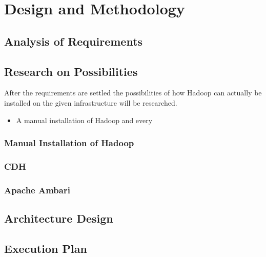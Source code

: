 \chapter{Design and Methodology}
\label{chap:design}

\section{Analysis of Requirements}

\section{Research on Possibilities}

After the requirements are settled
the possibilities of how Hadoop can actually be installed 
on the given infrastructure will be researched.

\begin{itemize}
    \item A manual installation of Hadoop and every
\end{itemize}

\subsection{Manual Installation of Hadoop}

\subsection{\acl{CDH}}

\subsection{Apache Ambari}

\section{Architecture Design}

\section{Execution Plan}
